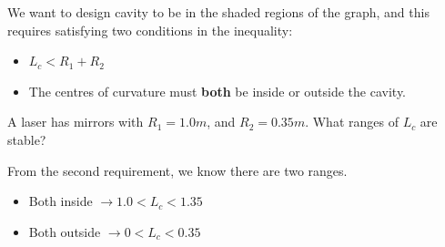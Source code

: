 \documentclass[a4paper, 11pt, normalem]{report}
\begin{document}
We want to design cavity to be in the shaded regions of the graph, and this requires satisfying two conditions in the inequality:
\begin{itemize}
    \item $L_c < R_1 + R_2$
    \item The centres of curvature must \textbf{both} be inside or outside the cavity.
        \begin{figure}[H]
            \centering
        \end{figure}
\end{itemize}

\begin{example}
    A laser has mirrors with $R_1=1.0m$, and $R_2 = 0.35m$.
    What ranges of $L_c$ are stable?

    From the second requirement, we know there are two ranges.
    \begin{itemize}
        \item Both inside $\to 1.0 < L_c < 1.35$
        \item Both outside $\to 0 < L_c < 0.35$
    \end{itemize}
\end{example}
\end{document}
